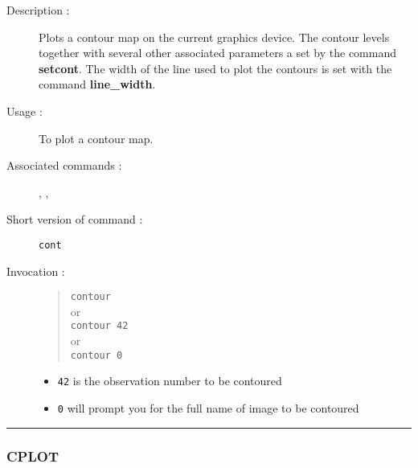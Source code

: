\begin{description}

\item[Description :] Plots a contour map on the current graphics
device.  The contour levels together with several other associated
parameters a set by the command {\bf setcont}.  The width of the line
used to plot the contours is set with the command {\bf line\_width}.

\item[Usage :] To plot a contour map.
\item[Associated commands :] {\tt {}}, 
{\tt {}}, {\tt {}}
\item[Short version of command :] {\tt cont}
\item[Invocation :]

\begin{quote}{\tt  contour }\\
or \\
{\tt contour 42 }\\
or \\
{\tt contour 0 }
\end{quote}

\begin{itemize}
\item {\tt 42} is the observation number to be contoured
\item {\tt 0} will prompt you for the full name of image to be contoured
\end{itemize}

\end{description}

\hrule 
\subsubsection*{\label{CPLOT}CPLOT}

